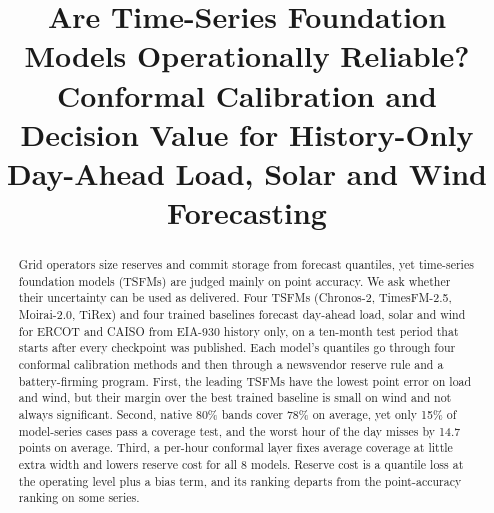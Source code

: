 \documentclass[conference]{IEEEtran}
\begin{document}
\title{Are Time-Series Foundation Models Operationally Reliable? Conformal Calibration and Decision Value for History-Only Day-Ahead Load, Solar and Wind Forecasting}

\author{
\and
{}
\and
{}
}

\maketitle

\begin{abstract}
Grid operators size reserves and commit storage from forecast quantiles, yet time-series foundation models (TSFMs) are judged mainly on point accuracy. We ask whether their uncertainty can be used as delivered. Four TSFMs (Chronos-2, TimesFM-2.5, Moirai-2.0, TiRex) and four trained baselines forecast day-ahead load, solar and wind for ERCOT and CAISO from EIA-930 history only, on a ten-month test period that starts after every checkpoint was published. Each model's quantiles go through four conformal calibration methods and then through a newsvendor reserve rule and a battery-firming program. First, the leading TSFMs have the lowest point error on load and wind, but their margin over the best trained baseline is small on wind and not always significant. Second, native 80\% bands cover 78\% on average, yet only 15\% of model-series cases pass a coverage test, and the worst hour of the day misses by 14.7 points on average. Third, a per-hour conformal layer fixes average coverage at little extra width and lowers reserve cost for all 8 models. Reserve cost is a quantile loss at the operating level plus a bias term, and its ranking departs from the point-accuracy ranking on some series.
\end{abstract}
\end{document}
